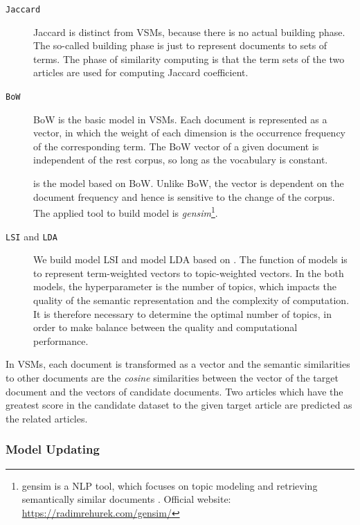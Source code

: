 \begin{description}
\item[\texttt{Jaccard}] Jaccard is distinct from VSMs, because there is no actual building phase. The so-called building phase is just to represent documents to sets of terms. The phase of similarity computing is that the term sets of the two articles are used for computing Jaccard coefficient.  
\item[\texttt{BoW}] BoW is the basic model in VSMs. Each document is represented as a vector, in which the weight of each dimension is the occurrence frequency of the corresponding term. The BoW vector of a given document is independent of the rest corpus, so long as the vocabulary is constant.
\item[\texttt{\tfidf{}}] \tfidf{} is the model based on BoW. Unlike BoW, the \tfidf{} vector is dependent on the document frequency and hence is sensitive to the change of the corpus. The applied tool to build \tfidf{} model is \textit{gensim}\footnote{gensim is a NLP tool, which focuses on topic modeling and retrieving semantically similar documents \cite{rehurek_lrec}. Official website: \url{https://radimrehurek.com/gensim/}}.
\item[\texttt{LSI} and \texttt{LDA}] We build model LSI and model LDA based on \tfidf{}. The function of models is to represent term-weighted vectors to topic-weighted vectors. In the both models, the hyperparameter is the number of topics, which impacts the quality of the semantic representation and the complexity of computation. It is therefore necessary to determine the optimal number of topics, in order to make balance between the quality and computational performance. 
\end{description}

In VSMs, each document is transformed as a vector and the semantic similarities to other documents are the \textit{cosine} similarities between the vector of the target document and the vectors of candidate documents. Two articles which have the greatest score in the candidate dataset to the given target article are predicted as the related articles. 
\subsubsection{Model Updating}

